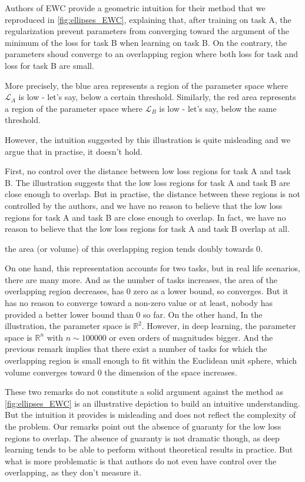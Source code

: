 \documentclass[twocolumn]{article}
\begin{document}
\vspace{1mm}
\noindent
Authors of EWC provide a geometric intuition for their method that we reproduced in \ref{fig:ellipses_EWC}, explaining that, after training on task A, the regularization prevent parameters from converging toward the argument of the minimum of the loss for task B when learning on task B. On the contrary, the parameters shoud converge to an overlapping region where both loss for task and loss for task B are small.

More precisely, the blue area represents a region of the parameter space where $\mathcal{L}_A$ is low - let's say, below a certain threshold. Similarly, the red area represents a region of the parameter space where $\mathcal{L}_B$ is low - let's say, below the same threshold. 

However, the intuition suggested by this illustration is quite misleading and we argue that in practise, it doesn't hold.

\vspace{1mm}
\noindent
First, no control over the distance between low loss regions for task A and task B. The illustration suggests that the low loss regions for task A and task B are close enough to overlap. But in practise, the distance between these regions is not controlled by the authors, and we have no reason to believe that the low loss regions for task A and task B are close enough to overlap. In fact, we have no reason to believe that the low loss regions for task A and task B overlap at all.

\vspace{1mm}
\noindent
the area (or volume) of this overlapping region tends doubly towards 0.

On one hand, this representation accounts for two tasks, but in real life scenarios, there are many more. And as the number of tasks increases, the area of the overlapping region decreases, has 0 zero as a lower bound, so converges. But it has no reason to converge toward a non-zero value or at least, nobody has provided a better lower bound than 0 so far.
On the other hand, In the illustration, the parameter space is $\mathbb{R}^2$. However, in deep learning, the parameter space is $\mathbb{R}^n$ with $n \sim 100 000$ or even orders of magnitudes bigger. And the previous remark implies that there exist a number of tasks for which the overlapping region is small enough to fit within the Euclidean unit sphere, which volume converges toward 0 the dimension of the space increases. 

These two remarks do not constitute a solid argument against the method as \ref{fig:ellipses_EWC} is an illustrative depiction to build an intuitive understanding. But the intuition it provides is misleading and does not reflect the complexity of the problem. Our remarks point out the absence of guaranty for the low loss regions to overlap. The absence of guaranty is not dramatic though, as deep learning tends to be able to perform without theoretical results in practice. But what is more problematic is that authors do not even have control over the overlapping, as they don't measure it.
\end{document}
